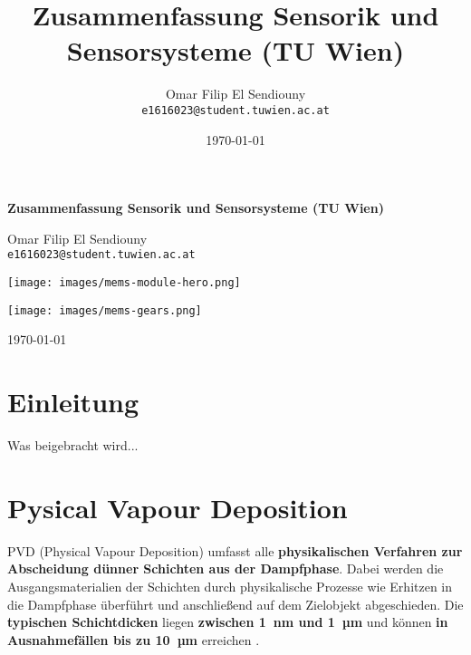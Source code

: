\documentclass{article} %
\title{Zusammenfassung Sensorik und Sensorsysteme (TU Wien)}
\author{Omar Filip El Sendiouny \\ \texttt{e1616023@student.tuwien.ac.at}}
\date{\today}
\begin{document}
\begin{titlepage}
    \centering
    \vspace{2cm}
    {\Huge \bfseries Zusammenfassung Sensorik und Sensorsysteme (TU Wien) \par}
    
    \vspace{1cm}
    {\Large Omar Filip El Sendiouny \\ \texttt{e1616023@student.tuwien.ac.at} \par}

    \vspace*{2cm}

    \texttt{[image: images/mems-module-hero.png]}
    
    \texttt{[image: images/mems-gears.png]} 

    \vspace*{2cm} 
    
    \vfill
    
    {\large \today \par}
\end{titlepage}

\tableofcontents
\listoftables
\listoffigures
\thispagestyle{empty}
\newpage


\section*{Einleitung} %
Was beigebracht wird...

\vspace{1em}
\section{Pysical Vapour Deposition} %
PVD (Physical Vapour Deposition) umfasst alle \textbf{physikalischen Verfahren zur Abscheidung dünner Schichten aus der Dampfphase}.
Dabei werden die Ausgangsmaterialien der Schichten durch physikalische Prozesse wie Erhitzen in die Dampfphase überführt und anschließend 
auf dem Zielobjekt abgeschieden. Die \textbf{typischen Schichtdicken} liegen \textbf{zwischen 1~nm und 1~µm} und können 
\textbf{in Ausnahmefällen bis zu 10~µm} erreichen \cite{keplinger2024}.

\vspace{1em}
\end{document}
